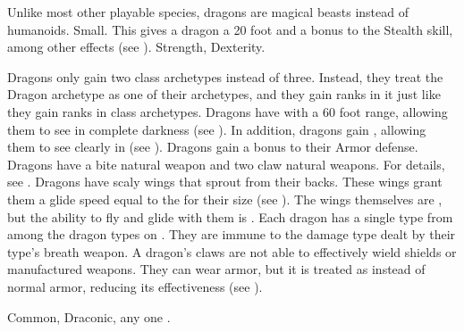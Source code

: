      Unlike most other playable species, dragons are magical beasts instead of humanoids.
     Small. This gives a dragon a 20 foot  and a  bonus to the Stealth skill, among other effects (see ).
      Strength,  Dexterity.
    \begin{itemize}
         Dragons only gain two class archetypes instead of three.
            Instead, they treat the Dragon archetype as one of their archetypes, and they gain ranks in it just like they gain ranks in class archetypes.
         Dragons have  with a 60 foot range, allowing them to see in complete darkness (see ).
            In addition, dragons gain , allowing them to see clearly in  (see ).
         Dragons gain a  bonus to their Armor defense.
         Dragons have a bite natural weapon and two claw natural weapons.
            For details, see .
         Dragons have scaly wings that sprout from their backs.
            These wings grant them a glide speed equal to the  for their size (see ).
            The wings themselves are , but the ability to fly and glide with them is \magical.
         Each dragon has a single type from among the dragon types on .
            They are immune to the damage type dealt by their type's breath weapon.
         A dragon's claws are not able to effectively wield shields or manufactured weapons.
            They can wear armor, but it is treated as  instead of normal armor, reducing its effectiveness (see ).
    \end{itemize}
     Common, Draconic, any one .


